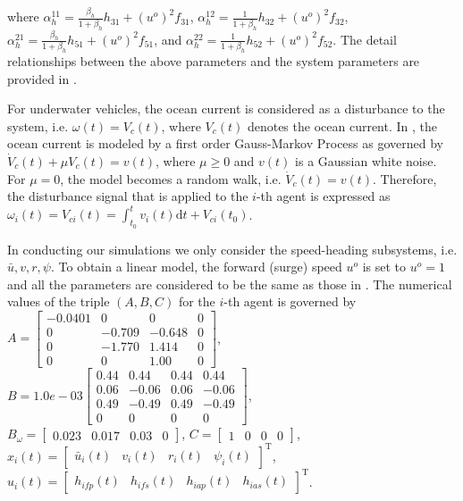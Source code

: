 \documentclass[12pt,draftcls,onecolumn]{IEEEtran}
\begin{document}
where $\alpha_h^{11}=\frac{\beta_h}{1+\beta_h}h_{31}+(u^o)^2f_{31}$, $\alpha_h^{12}=\frac{1}{1+\beta_h}h_{32}+(u^o)^2f_{32}$, $\alpha_h^{21}=\frac{\beta_h}{1+\beta_h}h_{51}+(u^o)^2f_{51}$, and $\alpha_h^{22}=\frac{1}{1+\beta_h}h_{52}+(u^o)^2f_{52}$. The detail relationships between the above parameters and the system parameters are  provided in \cite{jakuba2003}.
\par
For underwater vehicles, the ocean current is considered as a disturbance to the system, i.e. $\omega(t)=V_c(t)$, where $V_c(t)$ denotes the ocean current. In \cite{fossen2002}, the ocean current   is  modeled  by a first order Gauss-Markov Process as governed by $\dot V_c(t)+\mu V_c(t)=v(t)$, where $\mu\geq 0$ and $v(t)$ is a Gaussian white noise. For $\mu=0$, the model becomes a random walk, i.e. $\dot V_c(t)=v(t)$. Therefore, the disturbance signal that  is applied to the $i$-th agent is expressed as $\omega_i(t)=V_{ci}(t)=\int_{t_0}^tv_i(t)\text{d}t+V_{ci}(t_0)$. \par
 In conducting our simulations 
we only consider the  speed-heading subsystems, i.e. $\bar u,v,r,\psi$.  
To obtain a linear model, the  forward (surge) speed  $u^o$ is set to $u^o=1$ and  all the parameters are considered to be the same as those in 
\cite{jakuba2003,elec2:2015:MISC}. 
The  numerical values of the triple $(A,B,C)$  for the $i$-th agent is governed  by \\ 
$A=\begin{bmatrix} 
         -0.0401&0 &0&0\\
         0&-0.709&-0.648&0\\
         0 &-1.770&1.414&0\\
         0 &0&1.00&0\end{bmatrix}$,
            $B=1.0e-03\begin{bmatrix}
      0.44&0.44&0.44&0.44\\
       0.06&-0.06&0.06&-0.06\\
       0.49&-0.49&0.49&-0.49\\
        0&0&0&0
         \end{bmatrix}$,\\   
$B_{\omega}=\begin{bmatrix}0.023&0.017&0.03&0\end{bmatrix}$,  $C=\begin{bmatrix}1&0&0&0\end{bmatrix}$, $x_{i}(t)=\begin{bmatrix}\bar u_i(t)& v_i(t)& r_i(t)& \psi_i(t)\end{bmatrix}^\text{T}$,\\ $u_{i}(t)=\begin{bmatrix}h_{ifp}(t)&h_{ifs}(t)&h_{iap}(t)&h_{ias}(t)\end{bmatrix}^\text{T}$.
\end{document}
